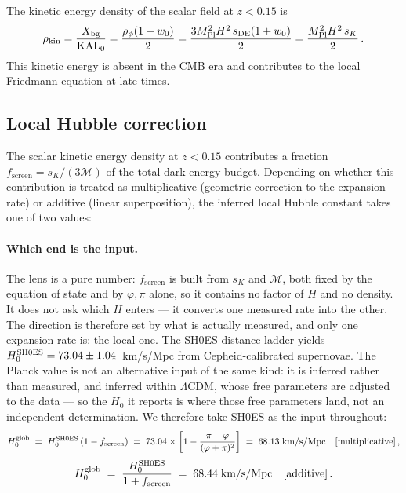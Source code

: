 \documentclass[12pt,a4paper]{article}
\newcommand{\phiG}{\varphi}
\newcommand{\KAL}{\mathrm{KAL}_0}
\newcommand{\MIRA}{\mathcal{M}}
\newcommand{\Mpl}{M_{\mathrm{Pl}}}
\newcommand{\fsc}{f_{\mathrm{screen}}}
\newcommand{\sK}{s_K}          %
\newcommand{\sDE}{s_{\mathrm{DE}}} %
\begin{document}
The kinetic energy density of the scalar field at $z < 0.15$ is
\begin{equation}
  \rho_{\rm kin} = \frac{X_{\rm bg}}{\KAL}
  = \frac{\rho_\phi(1+w_0)}{2}
  = \frac{3\Mpl^2 H^2\,\sDE(1+w_0)}{2}
  = \frac{\Mpl^2 H^2\,\sK}{2}\,.
  \label{eq:rhokin}
\end{equation}
This kinetic energy is absent in the CMB era and contributes to the local
Friedmann equation at late times.

\subsection{Local Hubble correction}
\label{sec:localH0}

The scalar kinetic energy density at $z < 0.15$ contributes a fraction
$\fsc = \sK/(3\MIRA)$ of the total dark-energy budget.
Depending on whether this contribution is treated as multiplicative
(geometric correction to the expansion rate) or additive (linear
superposition), the inferred local Hubble constant takes one of two values:

\paragraph{Which end is the input.}
The lens is a pure number: $\fsc$ is built from $\sK$ and $\MIRA$, both fixed
by the equation of state and by $\phiG,\pi$ alone, so it contains no factor of
$H$ and no density. It does not ask which $H$ enters --- it converts one
measured rate into the other. The direction is therefore set by what is
actually measured, and only one expansion rate is: the local one. The SH0ES
distance ladder \citep{Riess2022} yields $H_0^{\rm SH0ES}=73.04\pm1.04$~km/s/Mpc
from Cepheid-calibrated supernovae. The Planck value is not an alternative
input of the same kind: it is inferred rather than measured, and inferred
within $\Lambda$CDM, whose free parameters are adjusted to the data --- so the
$H_0$ it reports is where those free parameters land, not an independent
determination. We therefore take SH0ES as the input throughout:
\begin{equation}
  H_0^{\rm glob} \;=\; H_0^{\rm SH0ES}\,(1-\fsc)
  \;=\; 73.04\times\left[1 - \frac{\pi-\phiG}{(\phiG+\pi)^2}\right]
  \;=\; 68.13\;\text{km/s/Mpc}
  \quad[\text{multiplicative}]\,,
  \label{eq:H0local}
\end{equation}
\begin{equation}
  H_0^{\rm glob} \;=\; \frac{H_0^{\rm SH0ES}}{1+\fsc}
  \;=\; 68.44\;\text{km/s/Mpc}
  \quad[\text{additive}]\,.
  \label{eq:H0local_add}
\end{equation}
\end{document}
